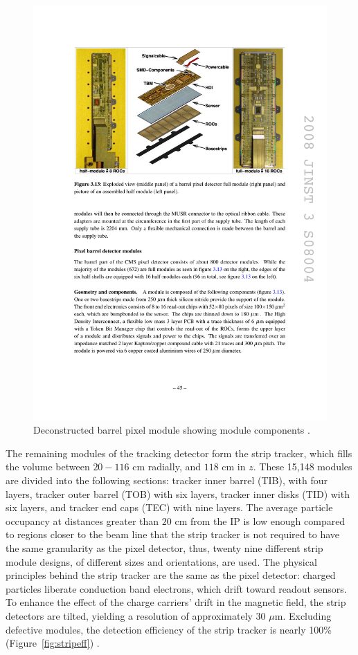 \begin{figure}[tbh]
\centering
\includegraphics[width=5.5in]{figures/pixelmodule.pdf}
\caption{Deconstructed barrel pixel module showing module components \cite{1748-0221-3-08-S08004}.}
\label{fig:pixmodule}
\end{figure}

\indent The remaining modules of the tracking detector form the strip tracker, which fills the volume between $20-116$ cm radially, and $118$ cm in $z$. These 15,148 modules are divided into the following sections: tracker inner barrel (TIB), with four layers, tracker outer barrel (TOB) with six layers, tracker inner disks (TID) with six layers, and tracker end caps (TEC) with nine layers. The average particle occupancy at distances greater than $20$ cm from the IP is low enough compared to regions closer to the beam line that the strip tracker is not required to have the same granularity as the pixel detector, thus, twenty nine different strip module designs, of different sizes and orientations, are used. The physical principles behind the strip tracker are the same as the pixel detector: charged particles liberate conduction band electrons, which drift toward readout sensors. To enhance the effect of the charge carriers' drift in the magnetic field, the strip detectors are tilted, yielding a resolution of approximately 30 $\mu$m. Excluding defective modules, the detection efficiency of the strip tracker is nearly 100\% (Figure~\ref{fig:stripeff}) \cite{Chatrchyan:2014fea}.

